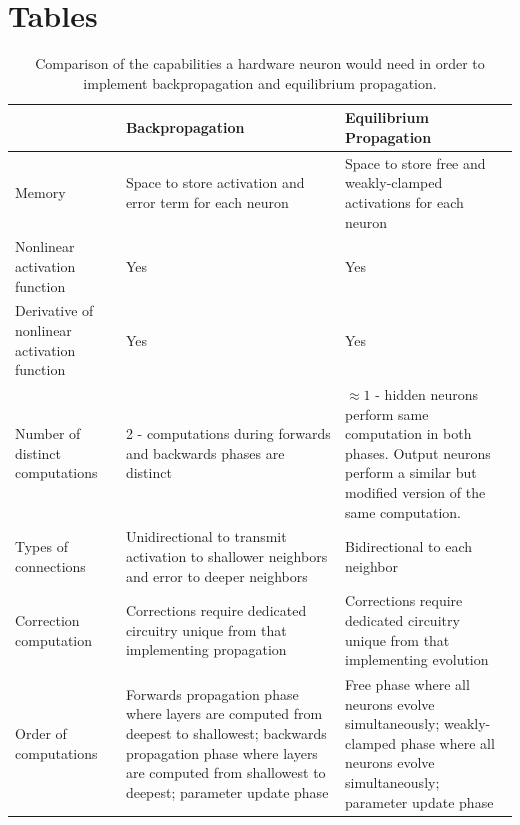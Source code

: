 \documentclass[utf8]{frontiersSCNS}
\begin{document}
\section*{Tables}
\begin{table}[h!]
\begin{center}
\begin{tabular}{|L||L|L|}
\hline 
&Backpropagation & Equilibrium Propagation \\ \hline\hline
Memory & Space to store activation and error term for each neuron & Space to store free and weakly-clamped activations for each neuron \\ \hline
Nonlinear activation function & Yes & Yes \\ \hline
Derivative of nonlinear activation function & Yes & Yes \\ \hline
Number of distinct computations & 2 - computations during forwards and backwards phases are distinct & $\approx 1$ - hidden neurons perform same computation in both phases. Output neurons perform a similar but modified version of the same computation. \\ \hline
Types of connections & Unidirectional to transmit activation to shallower neighbors and error to deeper neighbors & Bidirectional to each neighbor \\ \hline
Correction computation & Corrections require dedicated circuitry unique from that implementing propagation & Corrections require dedicated circuitry unique from that implementing evolution \\ \hline
Order of computations & Forwards propagation phase where layers are computed from deepest to shallowest; backwards propagation phase where layers are computed from shallowest to deepest; parameter update phase & Free phase where all neurons evolve simultaneously; weakly-clamped phase where all neurons evolve simultaneously; parameter update phase \\ \hline
\end{tabular}
\end{center}
\caption{Comparison of the capabilities a hardware neuron would need in order to implement backpropagation and equilibrium propagation.} \label{table:bp_eqp_contrast}
\end{table}
\end{document}
